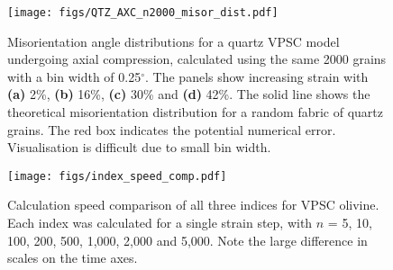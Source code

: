 \documentclass[a4paper,12pt,twoside]{report}
\numberwithin{equation}{chapter}
\begin{document}
\begin{figure}[h!]
  \centering
    \texttt{[image: figs/QTZ\_AXC\_n2000\_misor\_dist.pdf]}
  \caption[Misorientation angle distribution (quartz VPSC, higher resolution)]{Misorientation angle distributions for a quartz VPSC model undergoing axial compression, calculated using the same 2000 grains with a bin width of 0.25$^{\circ}$. The panels show increasing strain with \textbf{(a)} 2\%, \textbf{(b)} 16\%, \textbf{(c)} 30\% and \textbf{(d)} 42\%. The solid line shows the theoretical misorientation distribution for a random fabric of quartz grains. The red box indicates the potential numerical error. Visualisation is difficult due to small bin width.} 
  \label{fig:app:quartz_VPSC_anomaly}
\end{figure} 


\clearpage
\begin{figure}[h!]
  \centering
    \texttt{[image: figs/index\_speed\_comp.pdf]}
  \caption[Index speed comparison]{Calculation speed comparison of all three indices for VPSC olivine. Each index was calculated for a single strain step, with $n$ = 5, 10, 100, 200, 500, 1,000, 2,000 and 5,000. Note the large difference in scales on the time axes.} 
  \label{fig:app:index_speed}
\end{figure} 
\end{document}
